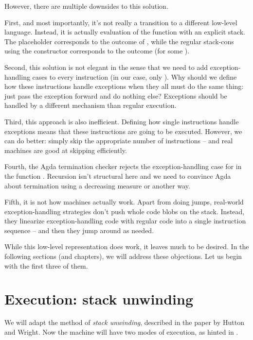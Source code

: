 \noindent However, there are multiple downsides to this solution.%
\label{sec:placeholders-objections}

First, and most importantly, it's not really a transition to a different
low-level language.  Instead, it is actually evaluation of the function
 with an explicit stack. The placeholder \ident{\void}
corresponds to the outcome  of , while the regular
stack-cons using the constructor \ident{\scons\!\!} corresponds to the outcome
 (for some ).

Second, this solution is not elegant in the sense that we need to add
exception-handling cases to every instruction (in our case, only ).
Why should we define how these instructions handle exceptions when they all
must do the same thing: just pass the exception forward and do nothing else?
Exceptions should be handled by a different mechanism than regular execution.

Third, this approach is also inefficient. Defining how single instructions
handle exceptions means that these instructions are going to be executed.
However, we can do better: simply skip the appropriate number of instructions
-- and real machines are good at skipping efficiently.

Fourth, the Agda termination checker rejects the exception-handling case for
 in the function . Recursion isn't structural
here and we need to convince Agda about termination using a decreasing measure
or another way.

Fifth, it is not how machines actually work. Apart from doing jumps, real-world
exception-handling strategies don't push whole code blobs on the stack.
Instead, they linearize exception-handling code with regular code into a single
instruction sequence -- and then they jump around as needed.

While this low-level representation does work, it leaves much to be desired. In
the following sections (and chapters), we will address these objections. Let us
begin with the first three of them.

\section{Execution: stack unwinding}

We will adapt the method of \emph{stack unwinding}, described in the paper by Hutton
and Wright. Now the machine will have two modes of execution, as hinted in
\cite[p.~7]{gmh:exceptions}.

